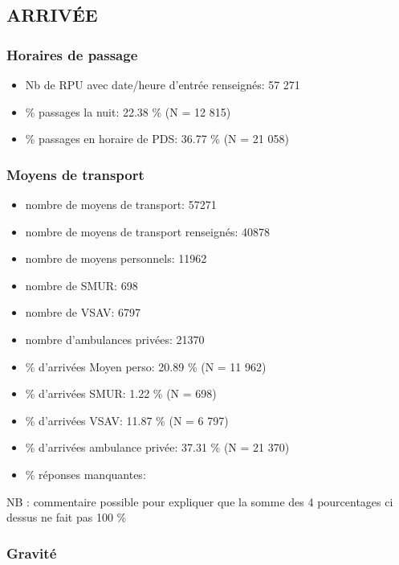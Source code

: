 \documentclass[]{article}
\begin{document}
\subsection{ARRIVÉE}\label{arrivee-1}

\subsubsection{Horaires de passage}\label{horaires-de-passage-1}

\begin{itemize}
\itemsep1pt\parskip0pt
\item
  Nb de RPU avec date/heure d'entrée renseignés: 57 271
\item
  \% passages la nuit: 22.38 \% (N = 12 815)
\item
  \% passages en horaire de PDS: 36.77 \% (N = 21 058)
\end{itemize}

\subsubsection{Moyens de transport}\label{moyens-de-transport}

\begin{itemize}
\item
  nombre de moyens de transport: 57271
\item
  nombre de moyens de transport renseignés: 40878
\item
  nombre de moyens personnels: 11962
\item
  nombre de SMUR: 698
\item
  nombre de VSAV: 6797
\item
  nombre d'ambulances privées: 21370
\item
  \% d'arrivées Moyen perso: 20.89 \% (N = 11 962)
\item
  \% d'arrivées SMUR: 1.22 \% (N = 698)
\item
  \% d'arrivées VSAV: 11.87 \% (N = 6 797)
\item
  \% d'arrivées ambulance privée: 37.31 \% (N = 21 370)
\item
  \% réponses manquantes:
\end{itemize}

NB : commentaire possible pour expliquer que la somme des 4 pourcentages
ci dessus ne fait pas 100 \%

\subsubsection{Gravité}\label{gravite}
\end{document}
